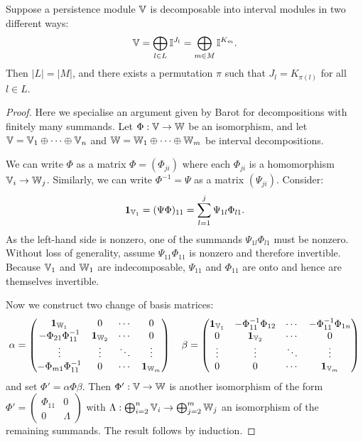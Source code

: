 \begin{theorem}
Suppose a persistence module $\mathbb{V}$ is decomposable into interval modules in two different ways:
\begin{align*}
\mathbb{V} = \bigoplus_{l \in L} \mathbb{I}^{J_l} = \bigoplus_{m \in M} \mathbb{I}^{K_m}.
\end{align*}
Then $|L| = |M|$, and there exists a permutation $\pi$ such that $J_l = K_{\pi(l)}$ for all $l \in L$.
\end{theorem}
\begin{proof} Here we specialise an argument given by Barot \cite{barot2006representations} for decompositions with finitely many summands. Let $\Phi : \mathbb{V} \to \mathbb{W}$ be an isomorphism, and let $\mathbb{V} = \mathbb{V}_1 \oplus \dots \oplus \mathbb{V}_n$ and $\mathbb{W} = \mathbb{W}_1 \oplus \dots \oplus \mathbb{W}_m$ be interval decompositions.

We can write $\Phi$ as a matrix $\Phi = (\Phi_{ji})$ where each $\Phi_{ji}$ is a homomorphism $\mathbb{V}_i \to \mathbb{W}_j$. Similarly, we can write $\Phi^{-1} = \Psi$ as a matrix $(\Psi_{ji})$. Consider: 
\begin{align*}
\mathbf{1}_{\mathbb{V}_1} = (\Psi \Phi)_{11} = \sum_{l=1}^j \Psi_{1l} \Phi_{l1}.
\end{align*}
As the left-hand side is nonzero, one of the summands $\Psi_{1l} \Phi_{l1}$ must be nonzero. Without loss of generality, assume $\Psi_{11} \Phi_{11}$ is nonzero and therefore invertible. Because $\mathbb{V}_1$ and $\mathbb{W}_1$ are indecomposable, $\Psi_{11}$ and $\Phi_{11}$ are onto and hence are themselves invertible.

Now we construct two change of basis matrices:
\begin{align*}
\alpha = \begin{pmatrix}
\mathbf{1}_{\mathbb{W}_1} & 0 & \cdots & 0 \\
-\Phi_{21} \Phi_{11}^{-1} & \mathbf{1}_{\mathbb{W}_2} & \cdots & 0 \\
\vdots & \vdots & \ddots & \vdots \\
-\Phi_{m1} \Phi_{11}^{-1} & 0 & \cdots & \mathbf{1}_{\mathbb{W}_m} \\
\end{pmatrix} \quad 
\beta = \begin{pmatrix}
\mathbf{1}_{\mathbb{V}_1} & -\Phi_{11}^{-1} \Phi_{12} & \cdots & -\Phi_{11}^{-1} \Phi_{1n} \\
0 & \mathbf{1}_{\mathbb{V}_2} & \cdots & 0 \\
\vdots & \vdots & \ddots & \vdots \\
0 & 0 & \cdots & \mathbf{1}_{\mathbb{V}_m} \\
\end{pmatrix}
\end{align*}
and set $\Phi' = \alpha \Phi \beta$. Then $\Phi' : \mathbb{V} \to \mathbb{W}$ is another isomorphism of the form $\Phi' = \begin{pmatrix}
\Phi_{11} & 0\\
0 & \Lambda
\end{pmatrix}$ 
with $\Lambda : \bigoplus_{i=2}^n \mathbb{V}_i \to \bigoplus_{j=2}^m \mathbb{W}_j$ an isomorphism of the remaining summands. The result follows by induction.


\end{proof}
